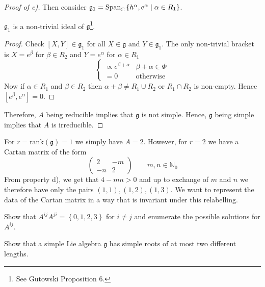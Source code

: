 \begin{proof}[Proof of e)]
  Then consider $\mathfrak{g}_1 = \text{Span}_{\mathbb{C}}\left\{h^{\alpha}, e^{\alpha} \suchthat \alpha \in R_1\right\}$.
  \begin{claim}
    $\mathfrak{g}_1$ is a non-trivial ideal of $\mathfrak{g}$\footnote{See Gutowski Proposition 6.}.
  \end{claim}
  \begin{leftbar}
    \begin{proof}
      Check $[X, Y] \in \mathfrak{g}_1$ for all $X \in \mathfrak{g}$ and $Y \in \mathfrak{g}_1$.
      The only non-trivial bracket is $X = e^{\beta}$ for $\beta \in R_2$ and $Y = e^{\alpha}$ for $\alpha \in R_1$
      \begin{equation}
        [e^{\beta} , e^{\alpha}] 
	\begin{cases}
	  \propto e^{\beta + \alpha} & \beta + \alpha \in \Phi \\
	  = 0 & \text{otherwise}
	\end{cases}
      \end{equation}
      Now if $\alpha \in R_1$ and $\beta \in R_2$ then $\alpha + \beta \neq R_1 \cup R_2$ or $R_1 \cap R_2$ is non-empty. Hence $[e^{\beta} , e^{\alpha}] = 0$.
    \end{proof}
  \end{leftbar}
  Therefore, $A$ being reducible implies that $\mathfrak{g}$ is not simple.
  Hence, $\mathfrak{g}$ being simple implies that $A$ is irreducible.
\end{proof}

For $r = \text{rank}(\mathfrak{g}) = 1$ we simply have $A = 2$. However, for $r = 2$ we have a Cartan matrix of the form
\begin{equation}
  \begin{pmatrix}
    2 & -m \\
    -n & 2
  \end{pmatrix}
  \qquad m, n \in \mathbb{N}_0
\end{equation}
From property d), we get that $4 - mn > 0$ and up to exchange of $m$ and $n$ we therefore have only the pairs $(1, 1), (1, 2), (1, 3)$.
We want to represent the data of the Cartan matrix in a way that is invariant under this relabelling.

\begin{exercise}
  Show that $A^{ij} A^{ji} = \left\{ 0,1,2,3 \right\}$ for $i \neq j$ and enumerate the possible solutions for $A^{ij}$.
\end{exercise}

\begin{exercise}
  Show that a simple Lie algebra $\mathfrak{g}$ has simple roots of at most two different lengths.
\end{exercise}

